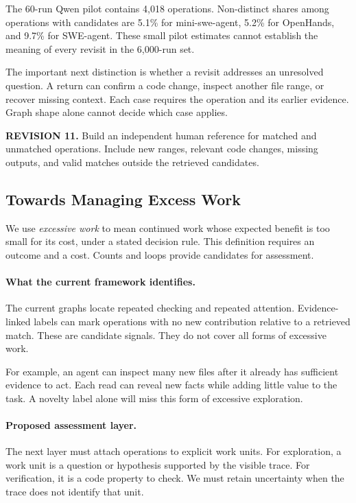 \documentclass[10pt,a4paper,twocolumn]{article}
\newcommand{\rev}[2]{\par\smallskip\noindent\begin{minipage}{\linewidth}\color{revision}\footnotesize\textbf{REVISION #1.} #2\end{minipage}\par\smallskip}
\begin{document}
The 60-run Qwen pilot contains 4,018 operations. Non-distinct shares among operations with candidates are 5.1\% for mini-swe-agent, 5.2\% for OpenHands, and 9.7\% for SWE-agent. These small pilot estimates cannot establish the meaning of every revisit in the 6,000-run set.

The important next distinction is whether a revisit addresses an unresolved question. A return can confirm a code change, inspect another file range, or recover missing context. Each case requires the operation and its earlier evidence. Graph shape alone cannot decide which case applies.
\rev{11}{Build an independent human reference for matched and unmatched operations. Include new ranges, relevant code changes, missing outputs, and valid matches outside the retrieved candidates.}

\subsection{Towards Managing Excess Work}
We use \emph{excessive work} to mean continued work whose expected benefit is too small for its cost, under a stated decision rule. This definition requires an outcome and a cost. Counts and loops provide candidates for assessment.

\paragraph{What the current framework identifies.}
The current graphs locate repeated checking and repeated attention. Evidence-linked labels can mark operations with no new contribution relative to a retrieved match. These are candidate signals. They do not cover all forms of excessive work.

For example, an agent can inspect many new files after it already has sufficient evidence to act. Each read can reveal new facts while adding little value to the task. A novelty label alone will miss this form of excessive exploration.

\paragraph{Proposed assessment layer.}
The next layer must attach operations to explicit work units. For exploration, a work unit is a question or hypothesis supported by the visible trace. For verification, it is a code property to check. We must retain uncertainty when the trace does not identify that unit.
\end{document}
